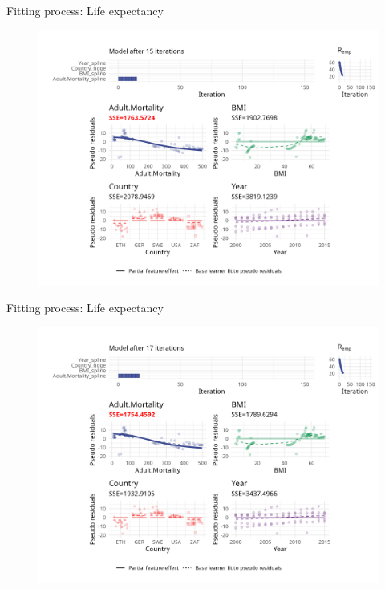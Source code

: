 \begin{frame}{Fitting process: Life expectancy}
	\begin{figure}
		\centering
		\includegraphics[width=\textwidth]{figures/cwb-anim/fig-iter-0015.png}
	\end{figure}
	\addtocounter{framenumber}{-1}
\end{frame}


\begin{frame}{Fitting process: Life expectancy}
	\begin{figure}
		\centering
		\includegraphics[width=\textwidth]{figures/cwb-anim/fig-iter-0017.png}
	\end{figure}
	\addtocounter{framenumber}{-1}
\end{frame}



